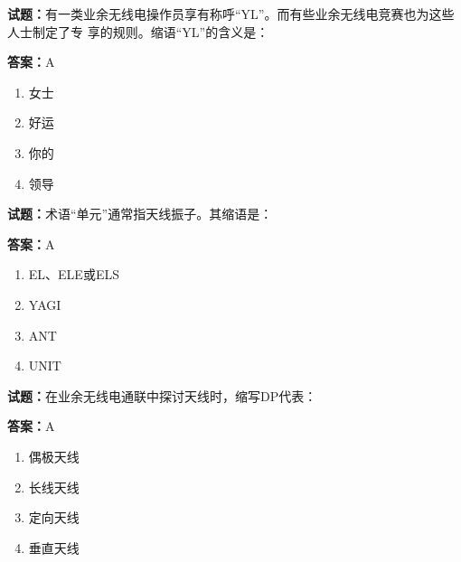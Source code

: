 \documentclass{ctexbook}
\begin{document}




\vspace{1em}

\textbf{试题：}有一类业余无线电操作员享有称呼“YL”。而有些业余无线电竞赛也为这些人士制定了专
享的规则。缩语“YL”的含义是： 

\textbf{答案：}A 

\begin{enumerate}[leftmargin=3em]
  \item 女士 

  \item 好运 


  \item 你的 

  \item 领导 

\end{enumerate}





\vspace{1em}

\textbf{试题：}术语“单元”通常指天线振子。其缩语是： 

\textbf{答案：}A 

\begin{enumerate}[leftmargin=3em]
  \item EL、ELE或ELS 

  \item YAGI 

  \item ANT 

  \item UNIT 

\end{enumerate}





\vspace{1em}

\textbf{试题：}在业余无线电通联中探讨天线时，缩写DP代表： 

\textbf{答案：}A 

\begin{enumerate}[leftmargin=3em]
  \item 偶极天线 

  \item 长线天线 

  \item 定向天线 

  \item 垂直天线 

\end{enumerate}
\end{document}
